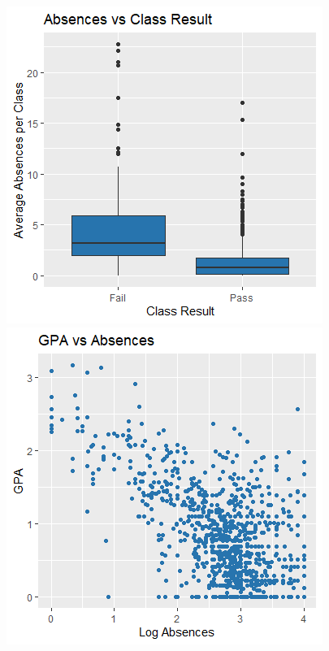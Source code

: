 \documentclass[12pt,letterpaper]{article}
\begin{document}
\begin{figure}[!bp]
  \centering
  \begin{minipage}[b]{0.49\textwidth}
    \includegraphics[width=\textwidth]{Plots/absence_fail.png}
  \end{minipage}
  \hfill
  \begin{minipage}[b]{0.49\textwidth}
    \includegraphics[width=\textwidth]{Plots/gpa_absences.png}
  \end{minipage}
\end{figure}
\end{document}
